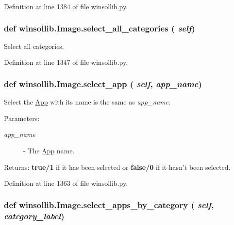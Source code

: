 Definition at line 1384 of file winsollib.py.\hypertarget{classwinsollib_1_1Image_7e61d4e92958164c68fde2569b5e3b87}{
\subsubsection[select\_\-all\_\-categories]{\setlength{\rightskip}{0pt plus 5cm}def winsollib.Image.select\_\-all\_\-categories ( {\em self})}}
\label{classwinsollib_1_1Image_7e61d4e92958164c68fde2569b5e3b87}


Select all categories. 



Definition at line 1347 of file winsollib.py.\hypertarget{classwinsollib_1_1Image_b795fc8c3ac12e8bc2184ffb42945a1d}{
\subsubsection[select\_\-app]{\setlength{\rightskip}{0pt plus 5cm}def winsollib.Image.select\_\-app ( {\em self},  {\em app\_\-name})}}
\label{classwinsollib_1_1Image_b795fc8c3ac12e8bc2184ffb42945a1d}


Select the \hyperlink{classwinsollib_1_1App}{App} with its name is the same as {\em app\_\-name\/}. 

\begin{Desc}
\item[Parameters:]
\begin{description}
\item[{\em app\_\-name}]- The \hyperlink{classwinsollib_1_1App}{App} name. \end{description}
\end{Desc}
\begin{Desc}
\item[Returns:]{\bf true/1} if it has been selected or {\bf false/0} if it hasn't been selected. \end{Desc}


Definition at line 1363 of file winsollib.py.\hypertarget{classwinsollib_1_1Image_e1b1929c5caf01e71941ba8f9878a452}{
\subsubsection[select\_\-apps\_\-by\_\-category]{\setlength{\rightskip}{0pt plus 5cm}def winsollib.Image.select\_\-apps\_\-by\_\-category ( {\em self},  {\em category\_\-label})}}
\label{classwinsollib_1_1Image_e1b1929c5caf01e71941ba8f9878a452}


